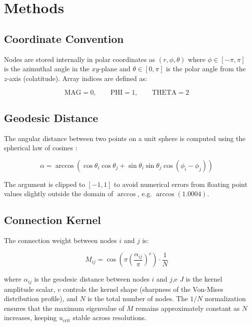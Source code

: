 \documentclass[12pt, letterpaper]{article}
\begin{document}
\section{Methods}

\subsection{Coordinate Convention}

Nodes are stored internally in polar coordinates as $(r, \phi, \theta)$ where $\phi \in [-\pi, \pi]$ is the azimuthal angle in the $xy$-plane and $\theta \in [0, \pi]$ is the polar angle from the $z$-axis (colatitude). Array indices are defined as:

\begin{equation}
    \text{MAG} = 0, \qquad \text{PHI} = 1, \qquad \text{THETA} = 2
\end{equation}

\subsection{Geodesic Distance}

The angular distance between two points on a unit sphere is computed using the spherical law of cosines \cite{bressloff2019stochastic}:

\begin{equation}
    \alpha = \arccos\left(\cos\theta_i \cos\theta_j + \sin\theta_i \sin\theta_j \cos(\phi_i - \phi_j)\right)
\end{equation}

The argument is clipped to $[-1, 1]$ to avoid numerical errors from floating point values slightly outside the domain of $\arccos$, e.g. $\arccos(1.0004)$.

\subsection{Connection Kernel}

The connection weight between nodes $i$ and $j$ is:

\begin{equation}
    M_{ij} = \cos\!\left(\pi \left(\frac{\alpha_{ij}}{\pi}\right)^v\right) \cdot \frac{1}{N}
\end{equation}

where $\alpha_{ij}$ is the geodesic distance between nodes $i$ and $j$,e $J$ is the kernel amplitude scalar, $v$ controls the kernel shape (sharpness of the Von-Mises distribution profile), and $N$ is the total number of nodes. The $1/N$ normalization ensures that the maximum eigenvalue of $M$ remains approximately constant as $N$ increases, keeping $u_{\text{crit}}$ stable across resolutions. 
\end{document}
